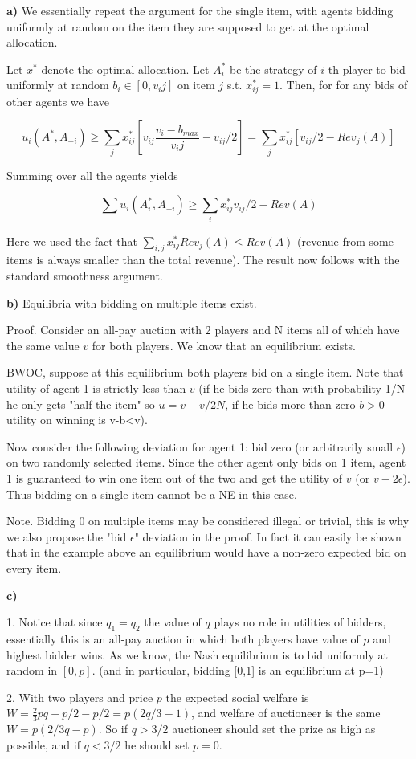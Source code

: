 \textbf{a)} We essentially repeat the argument for the single item, with agents bidding uniformly at random on the item they are supposed to get at the optimal allocation.

Let $x^*$ denote the optimal allocation. Let $A_i^*$ be the strategy of $i$-th player to bid uniformly at random $b_i\in[0,v_ij]$ on item $j$ s.t. $x_{ij}^*=1$. Then, for for any bids of other agents we have

$$
u_i(A^*,A_{-i}) \geq \sum_j x_{ij}^*[v_{ij} \frac{v_i-b_{max}}{v_ij} - v_{ij}/2]= \sum_j x_{ij}^*[v_{ij}/2-Rev_j(A)]
$$

Summing over all the agents yields

$$
\sum u_i(A_i^*,A_{-i}) \geq \sum_i x_{ij}^* v_{ij}/2 - Rev(A)
$$

Here we used the fact that $\sum_{i,j} x_{ij}^*Rev_j(A)\leq Rev(A)$ (revenue from some items is always smaller than the total revenue). The result now follows with the standard smoothness argument.

\textbf{b)} Equilibria with bidding on multiple items exist.

Proof. Consider an all-pay auction with 2 players and N items all of which have the same value $v$ for both players. We know that an equilibrium exists.

BWOC, suppose at this equilibrium both players bid on a single item. Note that utility of agent 1 is strictly less than $v$ (if he bids zero than with probability 1/N he only gets "half the item" so $u=v-v/2N$, if he bids more than zero $b>0$ utility on winning is v-b<v). 

Now consider the following deviation for agent 1: bid zero (or arbitrarily small $\epsilon$) on two randomly selected items. Since the other agent only bids on 1 item, agent 1 is guaranteed to win one item out of the two and get the utility of $v$ (or $v-2\epsilon$). Thus bidding on a single item cannot be a NE in this case.

Note. Bidding 0 on multiple items may be considered illegal or trivial, this is why we also propose the "bid $\epsilon$" deviation in the proof. In fact it can easily be shown that in the example above an equilibrium would have a non-zero expected bid on every item.

\textbf{c)}

1. Notice that since $q_1=q_2$ the value of $q$ plays no role in utilities of bidders, essentially this is an all-pay auction in which both players have value of $p$ and highest bidder wins. As we know, the Nash equilibrium is to bid uniformly at random in $[0,p]$. (and in particular, bidding [0,1] is an equilibrium at p=1)

2. With two players and price $p$ the expected social welfare is $W=\frac{2}{3}pq-p/2-p/2=p(2q/3-1)$, and  welfare of auctioneer is the same $W=p(2/3q-p)$. So if $q>3/2$ auctioneer should set the prize as high as possible, and if $q<3/2$ he should set $p=0$. 